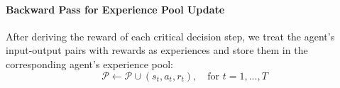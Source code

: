 \documentclass[preprint]{article}
\begin{document}

\paragraph{Backward Pass for Experience Pool Update}
After deriving the reward of each critical decision step, we treat the agent's input-output pairs with rewards as experiences and store them in the corresponding agent's experience pool:
\begin{equation}
\mathcal{P} \gets \mathcal{P} \cup {(s_t, a_t, r_t)}, \quad \text{for } t=1,...,T
\label{eq:experience_update}
\end{equation}
\end{document}

